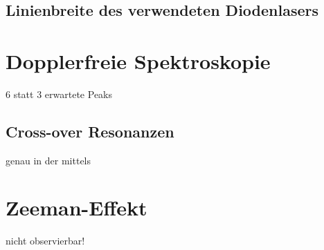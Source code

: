 \documentclass[../bericht.tex]{subfiles}
\begin{document}
      \subsection{Linienbreite des verwendeten Diodenlasers}
      \label{subsec:linienbreite-laser}

        



    \section{Dopplerfreie Spektroskopie}
    \label{sec:dopplerfreie-spektroskopie}


      6 statt 3 erwartete Peaks


      \subsection{Cross-over Resonanzen}
      \label{subsec:cross-over-resonanzen}

        genau in der mittels


    \section{Zeeman-Effekt}
    \label{sec:zeeman-effekt}

      nicht observierbar!
\end{document}
